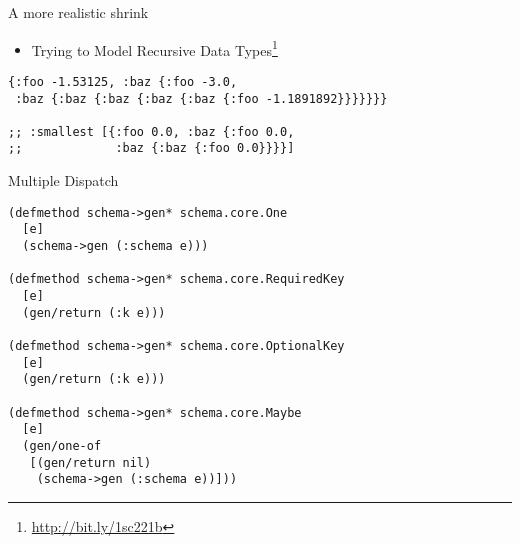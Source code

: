 \documentclass[presentation, bigger]{beamer}
\begin{document}
\begin{frame}[fragile,label=sec-]{A more realistic shrink}
 \begin{itemize}
\item Trying to Model Recursive Data Types\footnote{\url{http://bit.ly/1sc221b}}
\end{itemize}

\begin{verbatim}
{:foo -1.53125, :baz {:foo -3.0,
 :baz {:baz {:baz {:baz {:baz {:foo -1.1891892}}}}}}}

;; :smallest [{:foo 0.0, :baz {:foo 0.0,
;;             :baz {:baz {:foo 0.0}}}}]
\end{verbatim}
\end{frame}

\begin{frame}[fragile,shrink,label=sec-]{}
 \alert{Multiple Dispatch}

\begin{verbatim}
(defmethod schema->gen* schema.core.One
  [e]
  (schema->gen (:schema e)))

(defmethod schema->gen* schema.core.RequiredKey
  [e]
  (gen/return (:k e)))

(defmethod schema->gen* schema.core.OptionalKey
  [e]
  (gen/return (:k e)))

(defmethod schema->gen* schema.core.Maybe
  [e]
  (gen/one-of
   [(gen/return nil)
    (schema->gen (:schema e))]))
\end{verbatim}
\end{frame}
\end{document}
